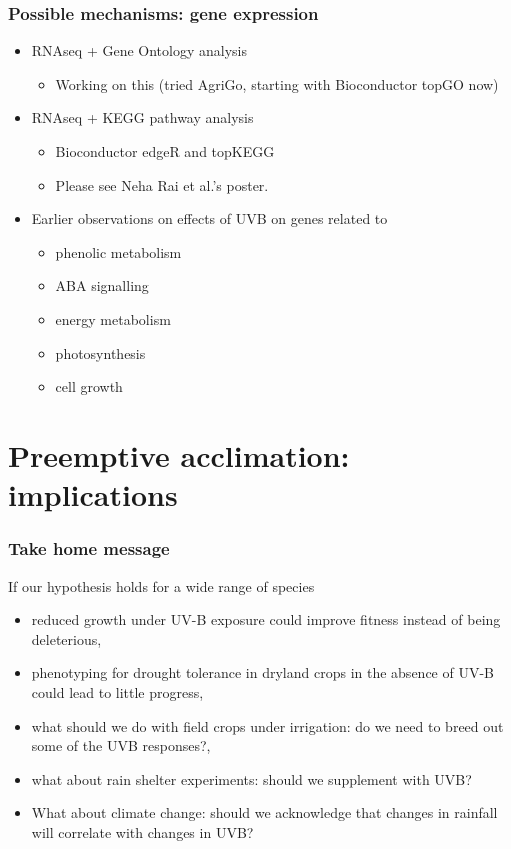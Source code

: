\documentclass[10pt]{beamer}\usepackage[]{graphicx}\usepackage[]{color}
\begin{document}
\begin{frame}
  \frametitle{Possible mechanisms: gene expression}
  \begin{itemize}
    \item RNAseq + Gene Ontology analysis
       \begin{itemize}
         \item Working on this (tried AgriGo, starting with Bioconductor topGO now)
       \end{itemize}
    \item RNAseq + KEGG pathway analysis
       \begin{itemize}
         \item Bioconductor edgeR and topKEGG
         \item Please see Neha Rai et al.'s poster.
       \end{itemize}
   \item Earlier observations on effects of UVB on genes related to
      \begin{itemize}
        \item phenolic metabolism
        \item ABA signalling
        \item energy metabolism
        \item photosynthesis
        \item cell growth
      \end{itemize}
  \end{itemize}
\end{frame}

\section{Preemptive acclimation: implications}

\begin{frame}
  \frametitle{Take home message}
  If our hypothesis holds for a wide range of species
  \begin{itemize}
    \item reduced growth under UV-B exposure could improve fitness instead of being deleterious,
    \item phenotyping for drought tolerance in dryland crops in the absence of UV-B could lead to little progress,
    \item what should we do with field crops under irrigation: do we need to breed out some of the UVB responses?,
    \item what about rain shelter experiments: should we supplement with UVB?
    \item What about climate change: should we acknowledge that changes in rainfall will correlate with changes in UVB?
  \end{itemize}
\end{frame}
\end{document}
